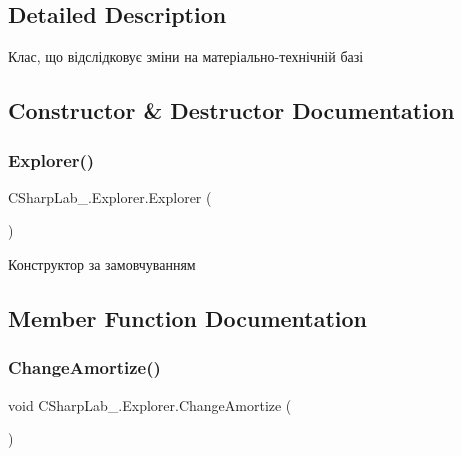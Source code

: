 \subsection{Detailed Description}
Клас, що відслідковує зміни на матеріально-\/технічній базі 



\subsection{Constructor \& Destructor Documentation}
\hypertarget{class_c_sharp_lab__1_1_1_explorer_a64fd7698367e71057067ce32a6c47d67}{}\label{class_c_sharp_lab__1_1_1_explorer_a64fd7698367e71057067ce32a6c47d67} 
\subsubsection{\texorpdfstring{Explorer()}{Explorer()}}
{\footnotesize\ttfamily C\+Sharp\+Lab\+\_.\+Explorer.\+Explorer (\begin{DoxyParamCaption}{ }\end{DoxyParamCaption})}



Конструктор за замовчуванням 



\subsection{Member Function Documentation}
\hypertarget{class_c_sharp_lab__1_1_1_explorer_a8f1c353e08ae3448ea231da558b048d9}{}\label{class_c_sharp_lab__1_1_1_explorer_a8f1c353e08ae3448ea231da558b048d9} 
\subsubsection{\texorpdfstring{Change\+Amortize()}{ChangeAmortize()}}
{\footnotesize\ttfamily void C\+Sharp\+Lab\+\_.\+Explorer.\+Change\+Amortize (\begin{DoxyParamCaption}{ }\end{DoxyParamCaption})}



